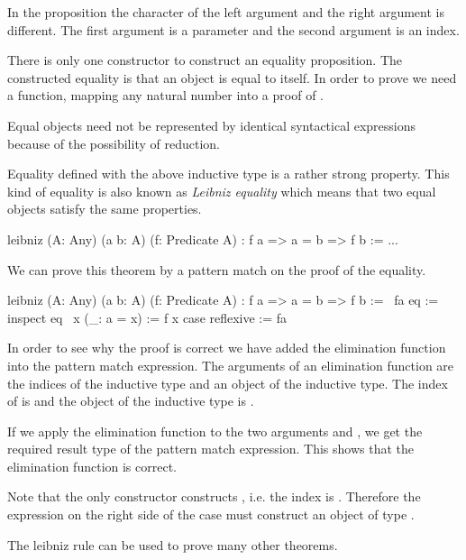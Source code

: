 In the proposition  the character of the left argument  and
the right argument  is different. The first argument is a parameter and
the second argument is an index.

There is only one constructor to construct an equality proposition. The
constructed equality is that an object is equal to itself. In order to prove
 we need a function, mapping any natural
number  into a proof of .

Equal objects need not be represented by identical syntactical expressions
because of the possibility of reduction.

Equality defined with the above inductive type is a rather strong
property. This kind of equality is also known as \emph{Leibniz equality} which
means that two equal objects satisfy the same properties.
%
\begin{alba}
    leibniz
        (A: Any)
        (a b: A)
        (f: Predicate A)
        : f a => a = b => f b
    :=
        ...
\end{alba}


We can prove this theorem by a pattern match on the proof of the equality.

\begin{alba}
    leibniz
        (A: Any)
        (a b: A)
        (f: Predicate A)
        : f a => a = b => f b
    :=
        \ fa eq :=
            inspect
                eq
                \ x (_: a = x) := f x
            case
                reflexive := fa
\end{alba}

In order to see why the proof is correct we have added the elimination function
into the pattern match expression. The arguments of an elimination function are
the indices of the inductive type and an object of the inductive type. The index
of  is  and the object of the inductive type is .

If we apply the elimination function to the two arguments  and
, we get the required result type  of the pattern
match expression. This shows that the elimination function is correct.

Note that the only constructor  constructs , i.e.
the index is . Therefore the expression on the right side of the case
must construct an object of type .


The leibniz rule can be used to prove many other theorems.

